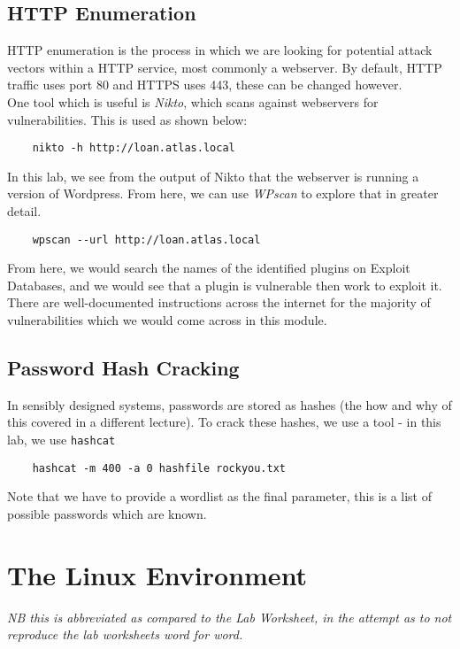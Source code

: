 \subsection{HTTP Enumeration}
HTTP enumeration is the process in which we are looking for potential attack vectors within a HTTP service, most commonly a webserver. By default, HTTP traffic uses port 80 and HTTPS uses 443, these can be changed however.\\

One tool which is useful is \textit{Nikto}, which scans against webservers for vulnerabilities. This is used as shown below:
\begin{verbatim}
    nikto -h http://loan.atlas.local
\end{verbatim}

In this lab, we see from the output of Nikto that the webserver is running a version of Wordpress. From here, we can use \textit{WPscan} to explore that in greater detail.
\begin{verbatim}
    wpscan --url http://loan.atlas.local
\end{verbatim}

From here, we would search the names of the identified plugins on Exploit Databases, and we would see that a plugin is vulnerable then work to exploit it. There are well-documented instructions across the internet for the majority of vulnerabilities which we would come across in this module.

\subsection{Password Hash Cracking}
In sensibly designed systems, passwords are stored as hashes (the how and why of this covered in a different lecture). To crack these hashes, we use a tool - in this lab, we use \verb|hashcat|
\begin{verbatim}
    hashcat -m 400 -a 0 hashfile rockyou.txt
\end{verbatim}
Note that we have to provide a wordlist as the final parameter, this is a list of possible passwords which are known. 

\section{The Linux Environment}
\textit{NB this is abbreviated as compared to the Lab Worksheet, in the attempt as to not reproduce the lab worksheets word for word.}\\

